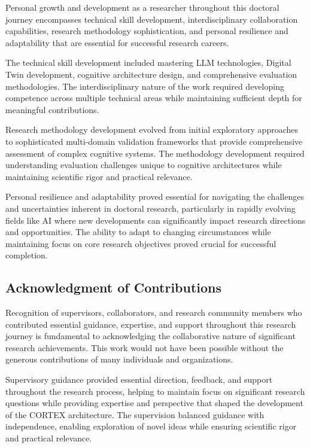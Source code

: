 Personal growth and development as a researcher throughout this doctoral journey encompasses technical skill development, interdisciplinary collaboration capabilities, research methodology sophistication, and personal resilience and adaptability that are essential for successful research careers.

The technical skill development included mastering LLM technologies, Digital Twin development, cognitive architecture design, and comprehensive evaluation methodologies. The interdisciplinary nature of the work required developing competence across multiple technical areas while maintaining sufficient depth for meaningful contributions.

Research methodology development evolved from initial exploratory approaches to sophisticated multi-domain validation frameworks that provide comprehensive assessment of complex cognitive systems. The methodology development required understanding evaluation challenges unique to cognitive architectures while maintaining scientific rigor and practical relevance.

Personal resilience and adaptability proved essential for navigating the challenges and uncertainties inherent in doctoral research, particularly in rapidly evolving fields like AI where new developments can significantly impact research directions and opportunities. The ability to adapt to changing circumstances while maintaining focus on core research objectives proved crucial for successful completion.

\subsection{Acknowledgment of Contributions}

Recognition of supervisors, collaborators, and research community members who contributed essential guidance, expertise, and support throughout this research journey is fundamental to acknowledging the collaborative nature of significant research achievements. This work would not have been possible without the generous contributions of many individuals and organizations.

Supervisory guidance provided essential direction, feedback, and support throughout the research process, helping to maintain focus on significant research questions while providing expertise and perspective that shaped the development of the CORTEX architecture. The supervision balanced guidance with independence, enabling exploration of novel ideas while ensuring scientific rigor and practical relevance.

